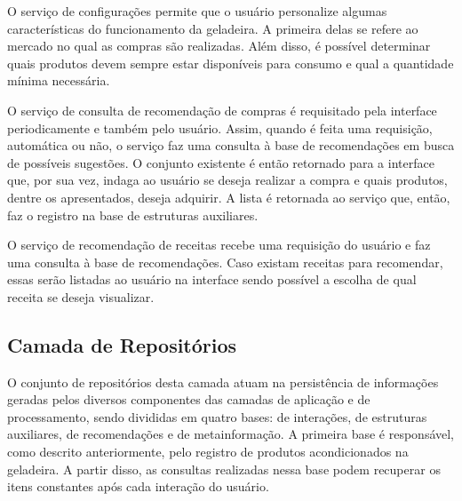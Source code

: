 

O serviço de configurações permite que o usuário personalize algumas características do funcionamento da geladeira. A primeira delas se refere ao mercado no qual as compras são realizadas. Além disso, é possível determinar quais produtos devem sempre estar disponíveis para consumo e qual a quantidade mínima necessária.


O serviço de consulta de recomendação de compras é requisitado pela interface periodicamente e também pelo usuário. Assim, quando é feita uma requisição, automática ou não, o serviço faz uma consulta à base de recomendações em busca de possíveis sugestões. O conjunto existente é então retornado para a interface que, por sua vez, indaga ao usuário se deseja realizar a compra e quais produtos, dentre os apresentados, deseja adquirir. A lista é retornada ao serviço que, então, faz o registro na base de estruturas auxiliares.


O serviço de recomendação de receitas recebe uma requisição do usuário e faz uma consulta à base de recomendações. Caso existam receitas para recomendar, essas serão listadas ao usuário na interface sendo possível a escolha de qual receita se deseja visualizar.


\subsection{Camada de Repositórios} \label{sec:camada-repo}

O conjunto de repositórios desta camada atuam na persistência de informações geradas pelos diversos componentes das camadas de aplicação e de processamento, sendo divididas em quatro bases: de interações, de estruturas auxiliares, de recomendações e de metainformação.
A primeira base é responsável, como descrito anteriormente, pelo registro de produtos acondicionados na geladeira. A partir disso, as consultas realizadas nessa base podem recuperar os itens constantes após cada interação do usuário.

